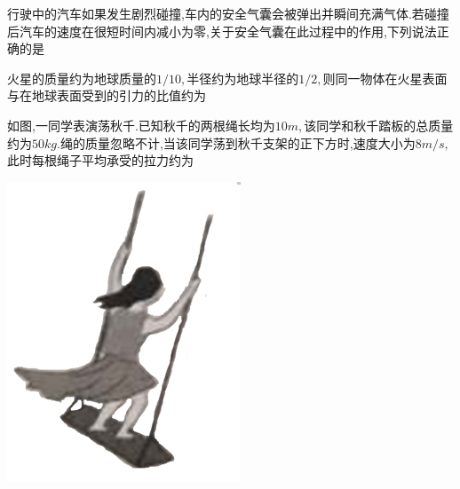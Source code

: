 \question[6]行驶中的汽车如果发生剧烈碰撞,车内的安全气囊会被弹出并瞬间充满气体.若碰撞后汽车的速度在很短时间内减小为零,关于安全气囊在此过程中的作用,下列说法正确的是
\begin{solution}{4cm}

\end{solution}



\question[6]火星的质量约为地球质量的$1/10,$半径约为地球半径的$1/2,$则同一物体在火星表面与在地球表面受到的引力的比值约为
\begin{solution}{4cm}

\end{solution}



\question[6]如图,一同学表演荡秋千.已知秋千的两根绳长均为$10m,$该同学和秋千踏板的总质量约为$50kg.$绳的质量忽略不计,当该同学荡到秋千支架的正下方时,速度大小为$8m/s,$此时每根绳子平均承受的拉力约为
\begin{center}
\includegraphics[]{img/image1.png}
\end{center}

\begin{solution}{4cm}

\end{solution}



